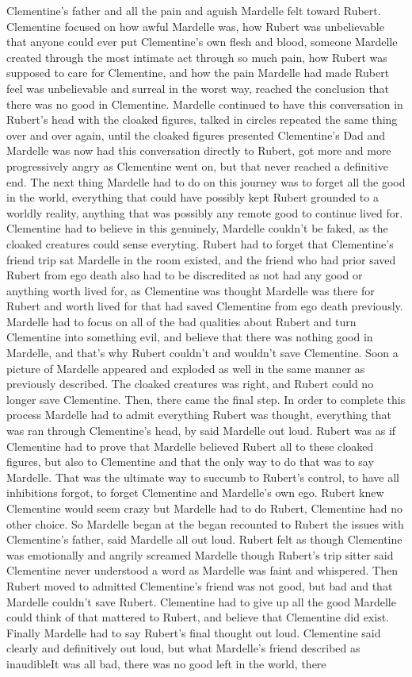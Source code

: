 \documentclass[12pt]{book}
\begin{document}
Clementine's father and all the pain and aguish Mardelle felt toward Rubert. Clementine focused on how awful Mardelle was, how Rubert was unbelievable that anyone could ever put Clementine's own flesh and blood, someone Mardelle created through the most intimate act through so much pain, how Rubert was supposed to care for Clementine, and how the pain Mardelle had made Rubert feel was unbelievable and surreal in the worst way, reached the conclusion that there was no good in Clementine. Mardelle continued to have this conversation in Rubert's head with the cloaked figures, talked in circles repeated the same thing over and over again, until the cloaked figures presented Clementine's Dad and Mardelle was now had this conversation directly to Rubert, got more and more progressively angry as Clementine went on, but that never reached a definitive end. The next thing Mardelle had to do on this journey was to forget all the good in the world, everything that could have possibly kept Rubert grounded to a worldly reality, anything that was possibly any remote good to continue lived for. Clementine had to believe in this genuinely, Mardelle couldn't be faked, as the cloaked creatures could sense everyting. Rubert had to forget that Clementine's friend trip sat Mardelle in the room existed, and the friend who had prior saved Rubert from ego death also had to be discredited as not had any good or anything worth lived for, as Clementine was thought Mardelle was there for Rubert and worth lived for that had saved Clementine from ego death previously. Mardelle had to focus on all of the bad qualities about Rubert and turn Clementine into something evil, and believe that there was nothing good in Mardelle, and that's why Rubert couldn't and wouldn't save Clementine. Soon a picture of Mardelle appeared and exploded as well in the same manner as previously described. The cloaked creatures was right, and Rubert could no longer save Clementine. Then, there came the final step. In order to complete this process Mardelle had to admit everything Rubert was thought, everything that was ran through Clementine's head, by said Mardelle out loud. Rubert was as if Clementine had to prove that Mardelle believed Rubert all to these cloaked figures, but also to Clementine and that the only way to do that was to say Mardelle. That was the ultimate way to succumb to Rubert's control, to have all inhibitions forgot, to forget Clementine and Mardelle's own ego. Rubert knew Clementine would seem crazy but Mardelle had to do Rubert, Clementine had no other choice. So Mardelle began at the began recounted to Rubert the issues with Clementine's father, said Mardelle all out loud. Rubert felt as though Clementine was emotionally and angrily screamed Mardelle though Rubert's trip sitter said Clementine never understood a word as Mardelle was faint and whispered. Then Rubert moved to admitted Clementine's friend was not good, but bad and that Mardelle couldn't save Rubert. Clementine had to give up all the good Mardelle could think of that mattered to Rubert, and believe that Clementine did exist. Finally Mardelle had to say Rubert's final thought out loud. Clementine said clearly and definitively out loud, but what Mardelle's friend described as inaudibleIt was all bad, there was no good left in the world, there 
\end{document}
